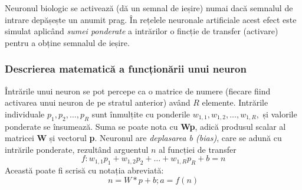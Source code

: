 Neuronul biologic se activează (dă un semnal de ieșire) numai dacă semnalul de intrare depășește un anumit prag. În rețelele neuronale artificiale acest efect este simulat aplicând \textit{sumei ponderate} a intrărilor o fincție de transfer (activare) pentru a obține semnalul de ieșire.



\subsubsection{Descrierea matematică a funcționării unui neuron}
Întrările unui neuron se pot percepe ca o matrice de numere (fiecare fiind activarea unui neuron de pe stratul anterior) având $R$ elemente. Intrările individuale $p_1, p_2, \dots, p_R$ sunt înmulțite cu ponderile $w_{1,1}, w_{1,2}, \dots, w_{1,R},$ și valorile ponderate se însumează. Suma se poate nota cu \textbf{Wp}, adică produsul scalar al matricei \textbf{W} și vectorul \textbf{p}.\newline
Neuronul are \textit{deplasarea b (bias)}, care se adună cu intrările ponderate, rezultând arguentul $n$ al funcției de transfer
\begin{equation}
f: w_{1,1}p_1 + w_{1,2}p_2 + \dots + w_{1,R}p_R + b = n
\end{equation}
Această poate fi scrisă cu notația abreviată:
\begin{equation}
n = W*p + b; a = f(n)
\end{equation}


